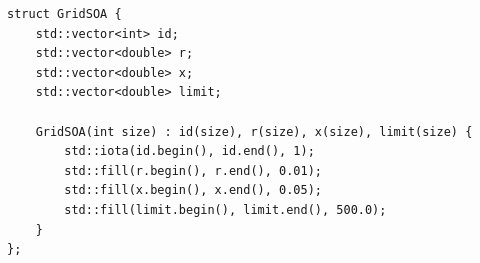\begin{verbatim}
struct GridSOA {
    std::vector<int> id;
    std::vector<double> r;
    std::vector<double> x;
    std::vector<double> limit;

    GridSOA(int size) : id(size), r(size), x(size), limit(size) {
        std::iota(id.begin(), id.end(), 1);
        std::fill(r.begin(), r.end(), 0.01);
        std::fill(x.begin(), x.end(), 0.05);
        std::fill(limit.begin(), limit.end(), 500.0);
    }
};
\end{verbatim}
